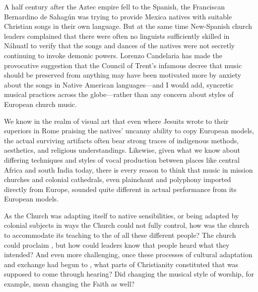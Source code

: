 A half century after the Aztec empire fell to the Spanish, the Franciscan 
Bernardino de Sahagún was trying to provide Mexica natives with suitable 
Christian songs in their own language.%
    \Autocite{Candelaria:Psalmodia}
But at the same time New-Spanish church leaders complained that there were 
often no linguists sufficiently skilled in Náhuatl to verify that the songs and 
dances of the natives were not secretly continuing to invoke demonic powers.%
    \Autocite[637]{Candelaria:Psalmodia}
Lorenzo Candelaria has made the provocative suggestion that the Council of 
Trent's infamous decree that music should be preserved from anything 
 may have been motivated more by anxiety about 
the songs in Native American languages---and I would add, syncretic musical 
practices across the globe---rather than any concern about styles of European 
church music.%
    \Autocite[637--638]{Candelaria:Psalmodia} %

We know in the realm of visual art that even where Jesuits wrote to their 
superiors in Rome praising the natives' uncanny ability to copy European 
models, the actual surviving artifacts often bear strong traces of indigenous 
methods, aesthetics, and religious understandings.%
    \Autocites[27--29, 34]{Bailey:Art}
Likewise, given what we know about differing techniques and styles of vocal 
production between places like central Africa and south India today, there is 
every reason to think that music in mission churches and colonial cathedrals, 
even plainchant and polyphony imported directly from Europe, sounded quite 
different in actual performance from its European models.

As the Church was adapting itself to native sensibilities, or being adapted by 
colonial subjects in ways the Church could not fully control, how was the 
church to accommodate its teaching to the  of 
all these different people?
The church could proclaim , but how could leaders know that 
people heard what they intended?
And even more challenging, once these processes of cultural adaptation and 
exchange had begun to , what parts of Christianity constituted 
 that was supposed to come through hearing?
Did changing the musical style of worship, for example, mean changing the Faith 
as well?

